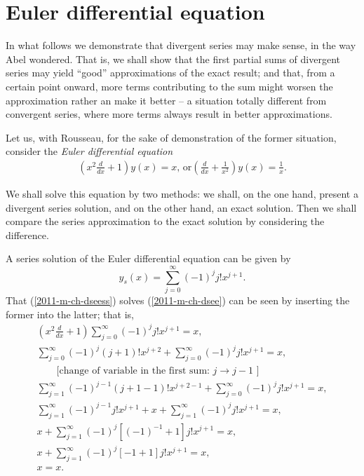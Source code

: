 \section{Euler differential equation}

In what follows we demonstrate that divergent series may make sense, in the way Abel
wondered.
That is, we shall show that the first partial sums of divergent series
may yield ``good'' approximations of the exact result; and
that, from a certain point onward, more terms contributing to the
sum  might worsen the approximation rather an make it better -- a situation totally different
from convergent series, where more terms always result in better approximations.

Let us, with Rousseau,
for the sake of demonstration of the former situation,
consider the {\em Euler differential equation}
\begin{equation}
\begin{array}{l}
\left(x^2 \frac{d}{dx} +1\right) y(x) = {x}\textrm{, or}
\left(\frac{d}{dx} +\frac{1}{x^2}\right) y(x) = \frac{1}{x}.
\end{array}
\label{2011-m-ch-dsee}
\end{equation}

We shall solve this equation by two methods:  we shall, on the one hand,
present a divergent series solution, and on the other hand, an exact solution.
Then we shall  compare the series approximation to the exact solution by considering
the difference.

A series solution of the Euler differential equation can be given by
\begin{equation}
{y_s} (x) = \sum_{j=0}^\infty (-1)^j j! x^{j+1}.
\label{2011-m-ch-dseess}
\end{equation}
That (\ref{2011-m-ch-dseess})
solves  (\ref{2011-m-ch-dsee})
can be seen by inserting the former into the latter; that is,
\begin{equation}
\begin{array}{l}
\left(x^2 \frac{d}{dx} +1\right) \sum_{j=0}^\infty (-1)^j j! x^{j+1} = {x},  \\
\sum_{j=0}^\infty (-1)^j (j+1)! x^{j+2} + \sum_{j=0}^\infty (-1)^j j! x^{j+1} = {x},  \\
\qquad \textrm{[change of variable in the first sum: } j \rightarrow j-1\textrm{ ]}\\
\sum_{j=1}^\infty (-1)^{j-1} (j+1-1)! x^{j+2-1} + \sum_{j=0}^\infty (-1)^j j! x^{j+1} = {x},  \\
\sum_{j=1}^\infty (-1)^{j-1} j! x^{j+1} + x +\sum_{j=1}^\infty (-1)^j j! x^{j+1} = {x},  \\
x +\sum_{j=1}^\infty (-1)^j\left[(-1)^{-1} +1\right] j! x^{j+1}    = {x},  \\
x +\sum_{j=1}^\infty (-1)^j\left[ -1  +1\right] j! x^{j+1}    = {x},  \\
x    = {x}.  \\
\end{array}
\label{2011-m-ch-dsee111}
\end{equation}


